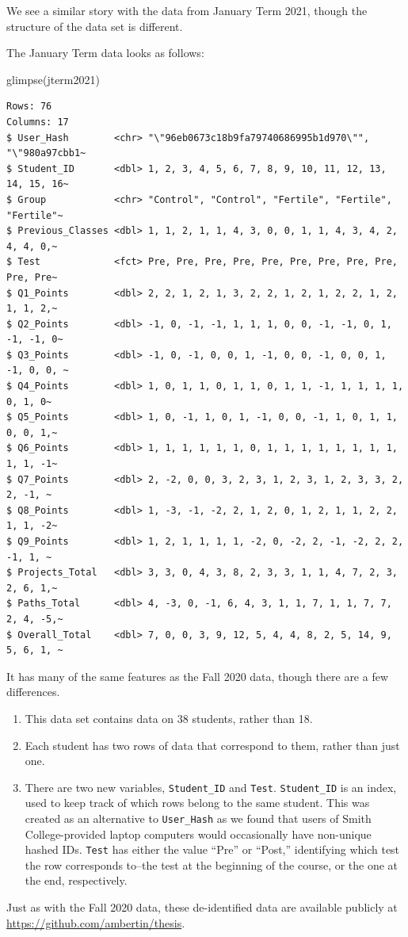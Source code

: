 \documentclass[12pt,twoside]{reedthesis}
\newenvironment{Shaded}{\begin{snugshade}}{\end{snugshade}}
\newcommand{\FunctionTok}[1]{\textcolor[rgb]{0.00,0.00,0.00}{#1}}
\newcommand{\NormalTok}[1]{#1}
\providecommand{\tightlist}{%
  \setlength{\itemsep}{0pt}\setlength{\parskip}{0pt}}
\begin{document}
We see a similar story with the data from January Term 2021, though the structure of the data set is different.

The January Term data looks as follows:
\begin{Shaded}
\begin{Highlighting}[]
\FunctionTok{glimpse}\NormalTok{(jterm2021)}
\end{Highlighting}
\end{Shaded}
\small
\begin{verbatim}
Rows: 76
Columns: 17
$ User_Hash        <chr> "\"96eb0673c18b9fa79740686995b1d970\"", "\"980a97cbb1~
$ Student_ID       <dbl> 1, 2, 3, 4, 5, 6, 7, 8, 9, 10, 11, 12, 13, 14, 15, 16~
$ Group            <chr> "Control", "Control", "Fertile", "Fertile", "Fertile"~
$ Previous_Classes <dbl> 1, 1, 2, 1, 1, 4, 3, 0, 0, 1, 1, 4, 3, 4, 2, 4, 4, 0,~
$ Test             <fct> Pre, Pre, Pre, Pre, Pre, Pre, Pre, Pre, Pre, Pre, Pre~
$ Q1_Points        <dbl> 2, 2, 1, 2, 1, 3, 2, 2, 1, 2, 1, 2, 2, 1, 2, 1, 1, 2,~
$ Q2_Points        <dbl> -1, 0, -1, -1, 1, 1, 1, 0, 0, -1, -1, 0, 1, -1, -1, 0~
$ Q3_Points        <dbl> -1, 0, -1, 0, 0, 1, -1, 0, 0, -1, 0, 0, 1, -1, 0, 0, ~
$ Q4_Points        <dbl> 1, 0, 1, 1, 0, 1, 1, 0, 1, 1, -1, 1, 1, 1, 1, 0, 1, 0~
$ Q5_Points        <dbl> 1, 0, -1, 1, 0, 1, -1, 0, 0, -1, 1, 0, 1, 1, 0, 0, 1,~
$ Q6_Points        <dbl> 1, 1, 1, 1, 1, 1, 0, 1, 1, 1, 1, 1, 1, 1, 1, 1, 1, -1~
$ Q7_Points        <dbl> 2, -2, 0, 0, 3, 2, 3, 1, 2, 3, 1, 2, 3, 3, 2, 2, -1, ~
$ Q8_Points        <dbl> 1, -3, -1, -2, 2, 1, 2, 0, 1, 2, 1, 1, 2, 2, 1, 1, -2~
$ Q9_Points        <dbl> 1, 2, 1, 1, 1, 1, -2, 0, -2, 2, -1, -2, 2, 2, -1, 1, ~
$ Projects_Total   <dbl> 3, 3, 0, 4, 3, 8, 2, 3, 3, 1, 1, 4, 7, 2, 3, 2, 6, 1,~
$ Paths_Total      <dbl> 4, -3, 0, -1, 6, 4, 3, 1, 1, 7, 1, 1, 7, 7, 2, 4, -5,~
$ Overall_Total    <dbl> 7, 0, 0, 3, 9, 12, 5, 4, 4, 8, 2, 5, 14, 9, 5, 6, 1, ~
\end{verbatim}
\normalsize

It has many of the same features as the Fall 2020 data, though there are a few differences.
\begin{enumerate}
\def\labelenumi{\arabic{enumi}.}
\tightlist
\item
  This data set contains data on 38 students, rather than 18.
\item
  Each student has two rows of data that correspond to them, rather than just one.
\item
  There are two new variables, \texttt{Student\_ID} and \texttt{Test}. \texttt{Student\_ID} is an index, used to keep track of which rows belong to the same student. This was created as an alternative to \texttt{User\_Hash} as we found that users of Smith College-provided laptop computers would occasionally have non-unique hashed IDs. \texttt{Test} has either the value ``Pre'' or ``Post,'' identifying which test the row corresponds to--the test at the beginning of the course, or the one at the end, respectively.
\end{enumerate}
Just as with the Fall 2020 data, these de-identified data are available publicly at \url{https://github.com/ambertin/thesis}.
\end{document}
